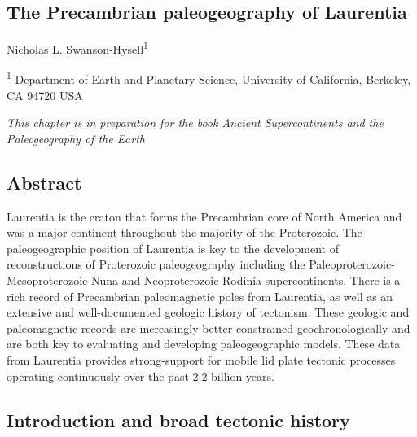 \documentclass[11pt,letterpaper]{article}
\begin{document}
\begin{flushleft}
\section{The Precambrian paleogeography of Laurentia}

Nicholas L. Swanson-Hysell\textsuperscript{1}

\bigskip

\textsuperscript{1} Department of Earth and Planetary Science, University of California, Berkeley, CA 94720 USA

\end{flushleft}

\noindent\textit{This chapter is in preparation for the book Ancient Supercontinents and the Paleogeography of the Earth}

\linenumbers

\subsection{Abstract}

Laurentia is the craton that forms the Precambrian core of North America and was a major continent throughout the majority of the Proterozoic. The paleogeographic position of Laurentia is key to the development of reconstructions of Proterozoic paleogeography including the Paleoproterozoic-Mesoproterozoic Nuna and Neoproterozoic Rodinia supercontinents. There is a rich record of Precambrian paleomagnetic poles from Laurentia, as well as an extensive and well-documented geologic history of tectonism. These geologic and paleomagnetic records are increasingly better constrained geochronologically and are both key to evaluating and developing paleogeographic models. These data from Laurentia provides strong-support for mobile lid plate tectonic processes operating continuously over the past 2.2 billion years.

\subsection{Introduction and broad tectonic history}
\end{document}
